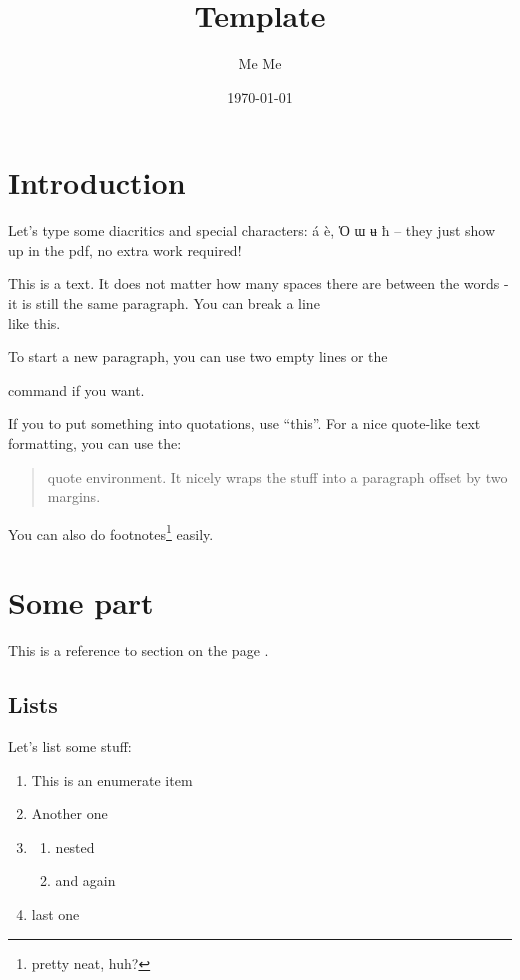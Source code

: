 \documentclass[12pt]{article}
\title{Template}
\author{Me Me}
\date{\today}
\begin{document}
\maketitle

\tableofcontents


\section*{Introduction}
\label{sec:intro} %

Let's type some diacritics and special characters: á è, Ὁ ɯ ʉ ħ -- they just show up in the pdf, no extra work required!

This is a text.
It   does not
matter how many
spaces there are
between the words - it is still the same paragraph.
You can break a line \\ like this.


To start a new paragraph, you can use two empty lines or the \par command if you want.

If you to put something into quotations, use ``this''. For a nice quote-like text formatting, you can use the:
\begin{quote}
	quote environment. It nicely wraps the stuff into a paragraph offset by two margins.
\end{quote}


You can also do footnotes\footnote{pretty neat, huh?} easily.


\section{Some part}

This is a reference to section  on the page \pageref{sec:intro}.

\subsection{Lists}

Let's list some stuff:

\begin{enumerate}
	\item This is an enumerate item
	\item Another one
	\item \begin{enumerate}
		\item nested
		\item and again
		\end{enumerate}
	\item last one
\end{enumerate}
\end{document}
